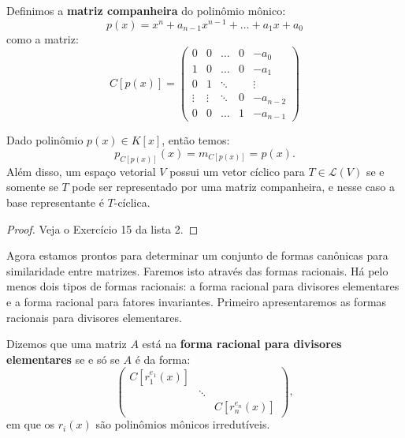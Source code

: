 \documentclass[11pt,twoside,a4paper]{book}
\begin{document}
\begin{definicao}
Definimos a \textbf{matriz companheira} do polinômio mônico:
\[
p(x)=x^n+a_{n-1}x^{n-1}+\dots+a_1x+a_0
\]
como a matriz:
\[
C[p(x)]=\begin{pmatrix}
0&0&\ldots&0&-a_0\\1&0&\ldots&0&-a_1\\0&1&\ddots&&\vdots\\\vdots&\vdots&\ddots&0&-a_{n-2}\\0&0&\ldots&1&-a_{n-1}
\end{pmatrix}
\]
\end{definicao}

\begin{teorema}
Dado polinômio $p(x)\in K[x]$, então temos:
\[
p_{C[p(x)]}(x)=m_{C[p(x)]}=p(x).
\]
Além disso, um espaço vetorial $V$ possui um vetor cíclico para $T\in\mathcal{L}(V)$ se e somente se $T$ pode ser representado por uma matriz companheira, e nesse caso a base representante é $T$-cíclica.
\end{teorema}
\begin{proof}
Veja o Exercício 15 da lista 2.
\end{proof}

\noindent
Agora estamos prontos para determinar um conjunto de formas canônicas para similaridade entre matrizes. Faremos isto através das formas racionais. Há pelo menos dois tipos de formas racionais: a forma racional para divisores elementares e a forma racional para fatores invariantes. Primeiro apresentaremos as formas racionais para divisores elementares.

\begin{definicao}
Dizemos que uma matriz $A$ está na \textbf{forma racional para divisores elementares} se e só se $A$ é da forma:
\[
\begin{pmatrix}
C[r_1^{e_1}(x)]&&\\&\ddots&\\&&C[r_n^{e_n}(x)]
\end{pmatrix},
\]
em que os $r_i(x)$ são polinômios mônicos irredutíveis.
\end{definicao}
\end{document}
